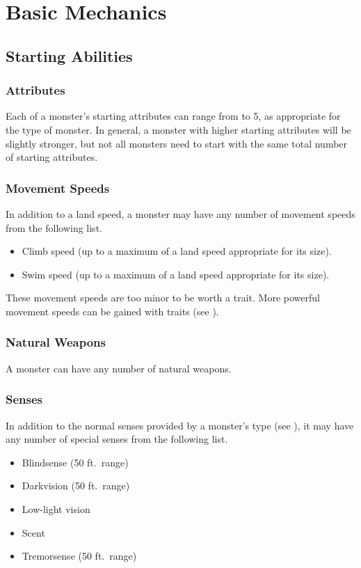 \chapter{Basic Mechanics}

\section{Starting Abilities}

    \subsection{Attributes}
    Each of a monster's starting attributes can range from  to 5, as appropriate for the type of monster.
    In general, a monster with higher starting attributes will be slightly stronger, but not all monsters need to start with the same total number of starting attributes.

\subsection{Movement Speeds}
    In addition to a land speed, a monster may have any number of movement speeds from the following list.
    \begin{itemize}
        \item Climb speed (up to a maximum of a land speed appropriate for its size).
        \item Swim speed (up to a maximum of a land speed appropriate for its size).
    \end{itemize}

    These movement speeds are too minor to be worth a trait.
    More powerful movement speeds can be gained with traits (see ).

    \subsection{Natural Weapons}
        A monster can have any number of natural weapons.

    \subsection{Senses}
        In addition to the normal senses provided by a monster's type (see ), it may have any number of special senses from the following list.
        \begin{itemize}
            \item Blindsense (50 ft.\ range)
            \item Darkvision (50 ft.\ range)
            \item Low-light vision
            \item Scent
            \item Tremorsense (50 ft.\ range)
        \end{itemize}

